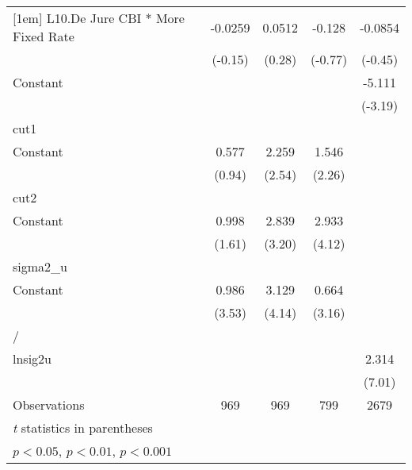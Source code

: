 {\begin{longtable}{l*{4}{c}}
[1em]
L10.De Jure CBI * More Fixed Rate&  -0.0259         &   0.0512         &   -0.128         &  -0.0854         \\
                &  (-0.15)         &   (0.28)         &  (-0.77)         &  (-0.45)         \\
[1em]
Constant        &                  &                  &                  &   -5.111\sym{**} \\
                &                  &                  &                  &  (-3.19)         \\
\hline
cut1            &                  &                  &                  &                  \\
Constant        &    0.577         &    2.259\sym{*}  &    1.546\sym{*}  &                  \\
                &   (0.94)         &   (2.54)         &   (2.26)         &                  \\
\hline
cut2            &                  &                  &                  &                  \\
Constant        &    0.998         &    2.839\sym{**} &    2.933\sym{***}&                  \\
                &   (1.61)         &   (3.20)         &   (4.12)         &                  \\
\hline
sigma2\_u        &                  &                  &                  &                  \\
Constant        &    0.986\sym{***}&    3.129\sym{***}&    0.664\sym{**} &                  \\
                &   (3.53)         &   (4.14)         &   (3.16)         &                  \\
\hline
/               &                  &                  &                  &                  \\
lnsig2u         &                  &                  &                  &    2.314\sym{***}\\
                &                  &                  &                  &   (7.01)         \\
\hline
Observations    &      969         &      969         &      799         &     2679         \\
\hline\hline
\multicolumn{5}{l}{\footnotesize \textit{t} statistics in parentheses}\\
\multicolumn{5}{l}{\footnotesize \sym{*} \(p<0.05\), \sym{**} \(p<0.01\), \sym{***} \(p<0.001\)}\\
\end{longtable}
}
